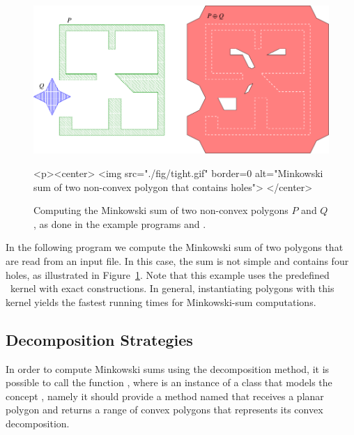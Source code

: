 
\begin{figure}[t]
\begin{ccTexOnly}
  \begin{center}
    \includegraphics{Minkowski_sum_2/fig/tight}
  \end{center}
\end{ccTexOnly}
\begin{ccHtmlOnly}
  <p><center>
  <img src="./fig/tight.gif" border=0 alt="Minkowski sum of two non-convex polygon that contains holes">
  </center>
\end{ccHtmlOnly}
\caption{Computing the Minkowski sum of two non-convex polygons $P$ and $Q$,
as done in the example programs  and
.}
\label{mink_fig:sum_holes}
\end{figure}

In the following program we compute the Minkowski sum of two polygons
that are read from an input file. In this case, the sum is not simple
and contains four holes, as illustrated in Figure~\ref{mink_fig:sum_holes}.
Note that this example uses the predefined \cgal\ kernel with exact
constructions. In general, instantiating polygons with this kernel yields
the fastest running times for Minkowski-sum computations.


\subsection{Decomposition Strategies\label{mink_ssec:decomp}}

In order to compute Minkowski sums using the decomposition method, it is
possible to call the function , where
 is an instance of a class that models the concept
, namely it should provide a method named
 that receives a planar polygon and returns a range
of convex polygons that represents its convex decomposition.

